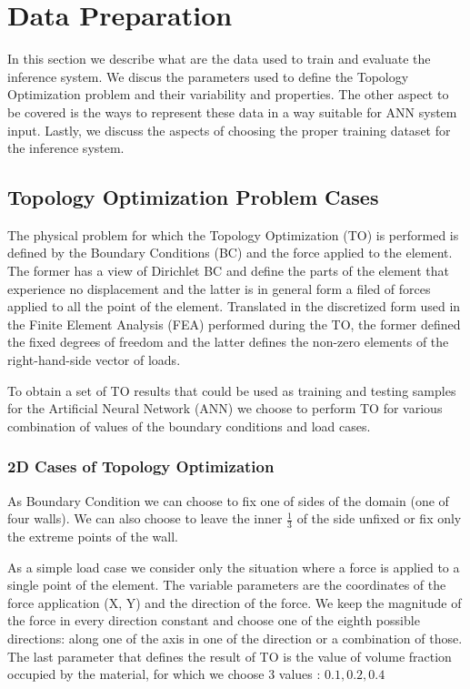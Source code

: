 


\section{Data Preparation}

In this section we describe what are the data used to train and evaluate the inference system.
We discus the parameters used to define the Topology Optimization problem and their variability and properties.
The other aspect to be covered is the ways to represent these data in a way suitable for ANN system input.
Lastly, we discuss the aspects of choosing the proper training dataset for the inference system.

\subsection{Topology Optimization Problem Cases}

The physical problem for which the Topology Optimization (TO) is performed is defined by the Boundary Conditions (BC) and the force applied to the element. 
The former has a view of Dirichlet BC and define the parts of the element that experience no displacement and the latter is in general form a filed of forces applied to all the point of the element. 
Translated in the discretized form used in the Finite Element Analysis (FEA) performed during the TO, the former defined the fixed degrees of freedom and the latter defines the non-zero elements of the right-hand-side vector of loads.
\medskip

To obtain a set of TO results that could be used as training and testing samples for the Artificial Neural Network (ANN) we choose to perform TO for various combination of values of the boundary conditions and load cases.
\medskip

\subsubsection{2D Cases of Topology Optimization}

As Boundary Condition we can choose to fix one of sides of the domain (one of four walls). 
We can also choose to leave the inner $\frac{1}{3}$ of the side unfixed or fix only the extreme points of the wall. 
\medskip

As a simple load case we consider only the situation where a force is applied to a single point of the element. 
The variable parameters are the coordinates of the force application (X, Y) and the direction of the force.
We keep the magnitude of the force in every direction constant and choose one of the eighth possible directions: along one of the axis in one of the direction or a combination of those.
The last parameter that defines the result of TO is the value of volume fraction occupied by the material, for which we choose $3$ values : $0.1, 0.2, 0.4$
\medskip


